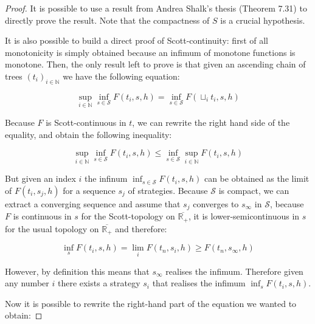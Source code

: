 \begin{proof}
    It is possible to use a result from Andrea Shalk's thesis 
    \cite{AndreaShalk} (Theorem 7.31)
    to directly prove the result. Note that 
    the compactness of $S$ is a crucial hypothesis. 

    It is also possible to build a direct proof of Scott-continuity:
    first of all monotonicity is simply obtained because an infimum 
    of monotone functions is monotone. Then, the only result left 
    to prove is that given an ascending chain of trees $(t_i)_{i \in \mathbb{N}}$
    we have the following equation:

    \begin{equation*}
        \sup_{i \in \mathbb{N}} \inf_{s \in \mathcal{S}} F(t_i,s,h) = 
    \inf_{s \in \mathcal{S}} F (\sqcup_i t_i, s, h)
    \end{equation*}
    
    Because $F$ is Scott-continuous in $t$, we can rewrite the right hand 
    side of the equality, and obtain the following inequality: 

    \begin{equation*}
        \sup_{i \in \mathbb{N}} \inf_{s \in \mathcal{S}} F(t_i,s,h) \leq 
        \inf_{s \in \mathcal{S}} \sup_{i \in \mathbb{N}} F (t_i, s, h)
    \end{equation*}
    
    But given an index $i$ the infinum $\inf_{s \in \mathcal{S}} F(t_i,s,h)$ 
    can be obtained as the limit of $F(t_i,s_j,h)$ for a sequence $s_j$ of
    strategies.
    Because 
    $\mathcal{S}$ is compact, we can extract a converging sequence and 
    assume that $s_j$ converges to $s_\infty$ in $\mathcal{S}$, because 
    $F$ is continuous in $s$ for the Scott-topology on
    $\overline{\mathbb{R}_+}$, it is lower-semicontinuous in $s$ 
    for the usual topology on $\overline{\mathbb{R}_+}$ and therefore:

    \begin{equation*}
        \inf_s F(t_i, s, h) = \lim_i F(t_n, s_i, h) 
                            \geq F (t_n, s_\infty, h)
    \end{equation*}

    However, by definition this means that 
    $s_\infty$ realises the infimum. Therefore given any 
    number $i$ there exists a strategy $s_i$ that realises 
    the infimum $\inf_s F(t_i, s, h)$.

    Now it is possible to rewrite the right-hand part 
    of the equation we wanted to obtain:


\end{proof}
